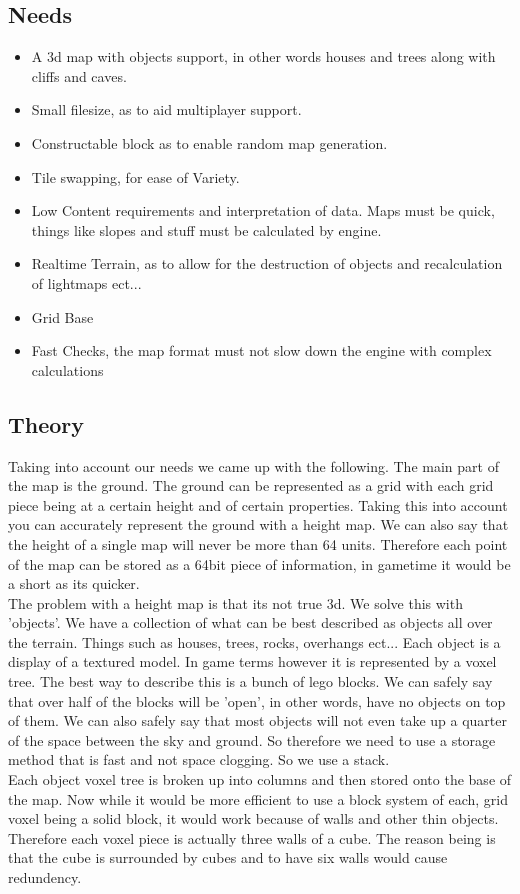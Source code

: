 \documentclass[a4paper,twocolumn]{article}
\begin{document}
\subsection{Needs}
\begin{itemize}
\item A 3d map with objects support, in other words houses and trees along with cliffs and caves.
\item Small filesize, as to aid multiplayer support.
\item Constructable block as to enable random map generation.
\item Tile swapping, for ease of Variety.
\item Low Content requirements and interpretation of data. Maps must be quick, things like slopes and stuff must be calculated by engine.
\item Realtime Terrain, as to allow for the destruction of objects and recalculation of lightmaps ect...
\item Grid Base
\item Fast Checks, the map format must not slow down the engine with complex calculations
\end{itemize}

\subsection{Theory}

Taking into account our needs we came up with the following. The main part of the map is the ground. The ground can be represented as a grid with each grid piece being at a certain height and of certain properties. Taking this into account you can accurately represent the ground with a height map. We can also say that the height of a single map will never be more than 64 units. Therefore each point of the map can be stored as a 64bit piece of information, in gametime it would be a short as its quicker.\\
The problem with a height map is that its not true 3d. We solve this with 'objects'. We have a collection of what can be best described as objects all over the terrain. Things such as houses, trees, rocks, overhangs ect... Each object is a display of a textured model. In game terms however it is represented by a voxel tree. The best way to describe this is a bunch of lego blocks. We can safely say that over half of the blocks will be 'open', in other words, have no objects on top of them. We can also safely say that most objects will not even take up a quarter of the space between the sky and ground. So therefore we need to use a storage method that is fast and not space clogging. So we use a stack.\\
Each object voxel tree is broken up into columns and then stored onto the base of the map. Now while it would be more efficient to use a block system of each, grid voxel being a solid block, it would work because of walls and other thin objects. Therefore each voxel piece is actually three walls of a cube. The reason being is that the cube is surrounded by cubes and to have six walls would cause redundency.
\end{document}
